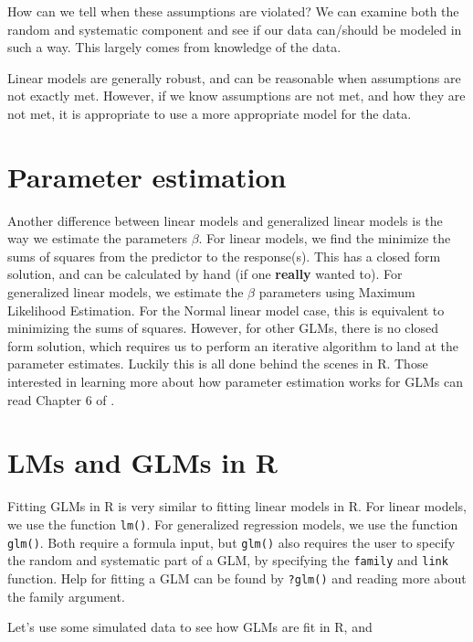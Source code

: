 \documentclass[
]{book}
\begin{document}
How can we tell when these assumptions are violated? We can examine both the random and systematic component and see if our data can/should be modeled in such a way. This largely comes from knowledge of the data.

Linear models are generally robust, and can be reasonable when assumptions are not exactly met. However, if we know assumptions are not met, and how they are not met, it is appropriate to use a more appropriate model for the data.

\hypertarget{parameter-estimation}{%
\section{Parameter estimation}\label{parameter-estimation}}

Another difference between linear models and generalized linear models is the way we estimate the parameters \(\beta\). For linear models, we find the minimize the sums of squares from the predictor to the response(s). This has a closed form solution, and can be calculated by hand (if one \textbf{really} wanted to). For generalized linear models, we estimate the \(\beta\) parameters using Maximum Likelihood Estimation. For the Normal linear model case, this is equivalent to minimizing the sums of squares. However, for other GLMs, there is no closed form solution, which requires us to perform an iterative algorithm to land at the parameter estimates. Luckily this is all done behind the scenes in R. Those interested in learning more about how parameter estimation works for GLMs can read Chapter 6 of \citep{dunn2018generalized}.

\hypertarget{lms-and-glms-in-r}{%
\section{LMs and GLMs in R}\label{lms-and-glms-in-r}}

Fitting GLMs in R is very similar to fitting linear models in R. For linear models, we use the function \texttt{lm()}. For generalized regression models, we use the function \texttt{glm()}. Both require a formula input, but \texttt{glm()} also requires the user to specify the random and systematic part of a GLM, by specifying the \texttt{family} and \texttt{link} function. Help for fitting a GLM can be found by \texttt{?glm()} and reading more about the family argument.

Let's use some simulated data to see how GLMs are fit in R, and
\end{document}
